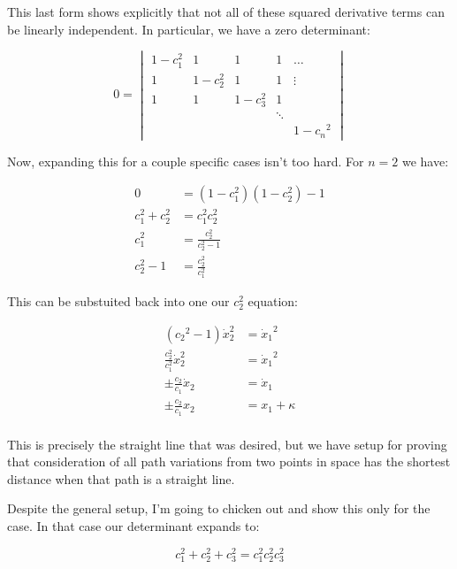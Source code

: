 \documentclass{article}
\newcommand{\xdot}[0]{\dot{x}}
\begin{document}
This last form shows explicitly that not all of these squared derivative terms can be linearly independent.  In particular, we have a
zero determinant:

\begin{equation*}
0 =
\begin{vmatrix}
1 - c_1^2   & 1            & 1         & 1 & \hdots \\
1           & 1 - c_2^2    & 1         & 1 & \vdots \\
1           & 1            & 1 - c_3^2 & 1 & \\
            &              &           & \ddots & \\
            &              &           &        & 1 - {c_n}^2
\end{vmatrix}
\end{equation*}

Now, expanding this for a couple specific cases isn't too hard.  For $n=2$ we have:

\begin{align*}
0 &= (1 - c_1^2)(1-c_2^2) - 1 \\
c_1^2 + c_2^2 &= c_1^2 c_2^2 \\
c_1^2 &= \frac{c_2^2}{ c_2^2 - 1 } \\
c_2^2 - 1 &= \frac{c_2^2}{ c_1^2 }
\end{align*}

This can be substuited back into one our $c_2^2$ equation:

\begin{align*}
({c_2}^2 -1)\xdot_2^2 &= {\xdot_1}^2 \\
\frac{c_2^2}{ c_1^2 } \xdot_2^2 &= {\xdot_1}^2 \\
\pm \frac{c_2}{ c_1 } \xdot_2 &= {\xdot_1} \\
\pm \frac{c_2}{ c_1 } x_2 &= x_1 + \kappa \\
\end{align*}

This is precisely the straight line that was desired, but we have setup for proving that consideration of all path variations from two points 
in  space has the shortest distance when that path is a straight line.

Despite the general setup, I'm going to chicken out and show this only for the  case.  In that case our determinant expands to:

\begin{equation*}
c_1^2 + c_2^2 + c_3^2 = c_1^2 c_2^2 c_3^2
\end{equation*}
\end{document}
